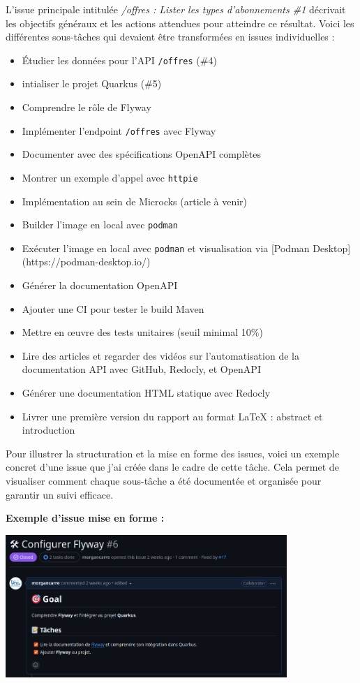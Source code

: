 \documentclass{article}
\begin{document}
	L’issue principale intitulée \textit{/offres : Lister les types d'abonnements \#1} décrivait les objectifs généraux et les actions attendues pour atteindre ce résultat. Voici les différentes sous-tâches qui devaient être transformées en issues individuelles :
	
	\begin{itemize}
		\item Étudier les données pour l'API \texttt{/offres} (\#4)
		\item intialiser le projet Quarkus (\#5)
		\item Comprendre le rôle de Flyway
		\item Implémenter l'endpoint \texttt{/offres} avec Flyway
		\item Documenter avec des spécifications OpenAPI complètes
		\item Montrer un exemple d’appel avec \texttt{httpie}
		\item Implémentation au sein de Microcks (article à venir)
		\item Builder l’image en local avec \texttt{podman}
		\item Exécuter l’image en local avec \texttt{podman} et visualisation via [Podman Desktop](https://podman-desktop.io/)
		\item Générer la documentation OpenAPI
		\item Ajouter une CI pour tester le build Maven
		\item Mettre en œuvre des tests unitaires (seuil minimal 10\%)
		\item Lire des articles et regarder des vidéos sur l’automatisation de la documentation API avec GitHub, Redocly, et OpenAPI
		\item Générer une documentation HTML statique avec Redocly
		\item Livrer une première version du rapport au format \LaTeX{} : abstract et introduction
	\end{itemize}
	
	Pour illustrer la structuration et la mise en forme des issues, voici un exemple concret d’une issue que j’ai créée dans le cadre de cette tâche. Cela permet de visualiser comment chaque sous-tâche a été documentée et organisée pour garantir un suivi efficace.
	
	\begin{center}
		\textbf{Exemple d'issue mise en forme :}
	\end{center}
	
	\vspace{0.5cm}
	\begin{center}
		\includegraphics[width=0.8\textwidth]{asset/ex_issue.png}
	\end{center}
	
\end{document}
